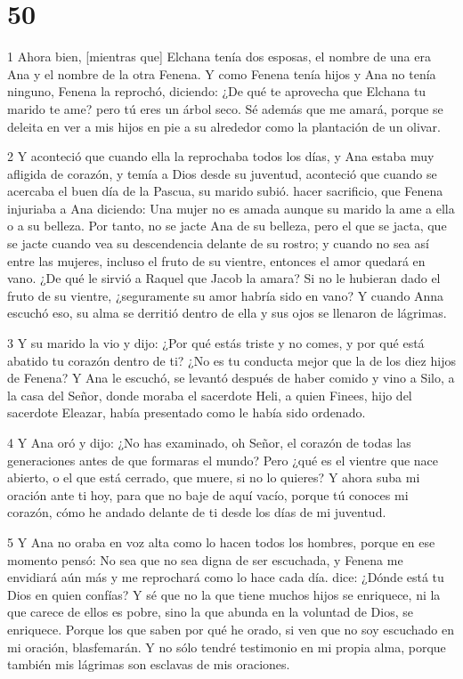 \chapter{50}

\par 1 Ahora bien, [mientras que] Elchana tenía dos esposas, el nombre de una era Ana y el nombre de la otra Fenena. Y como Fenena tenía hijos y Ana no tenía ninguno, Fenena la reprochó, diciendo: ¿De qué te aprovecha que Elchana tu marido te ame? pero tú eres un árbol seco. Sé además que me amará, porque se deleita en ver a mis hijos en pie a su alrededor como la plantación de un olivar.

\par 2 Y aconteció que cuando ella la reprochaba todos los días, y Ana estaba muy afligida de corazón, y temía a Dios desde su juventud, aconteció que cuando se acercaba el buen día de la Pascua, su marido subió. hacer sacrificio, que Fenena injuriaba a Ana diciendo: Una mujer no es amada aunque su marido la ame a ella o a su belleza. Por tanto, no se jacte Ana de su belleza, pero el que se jacta, que se jacte cuando vea su descendencia delante de su rostro; y cuando no sea así entre las mujeres, incluso el fruto de su vientre, entonces el amor quedará en vano. ¿De qué le sirvió a Raquel que Jacob la amara? Si no le hubieran dado el fruto de su vientre, ¿seguramente su amor habría sido en vano? Y cuando Anna escuchó eso, su alma se derritió dentro de ella y sus ojos se llenaron de lágrimas.

\par 3 Y su marido la vio y dijo: ¿Por qué estás triste y no comes, y por qué está abatido tu corazón dentro de ti? ¿No es tu conducta mejor que la de los diez hijos de Fenena? Y Ana le escuchó, se levantó después de haber comido y vino a Silo, a la casa del Señor, donde moraba el sacerdote Heli, a quien Finees, hijo del sacerdote Eleazar, había presentado como le había sido ordenado.

\par 4 Y Ana oró y dijo: ¿No has examinado, oh Señor, el corazón de todas las generaciones antes de que formaras el mundo? Pero ¿qué es el vientre que nace abierto, o el que está cerrado, que muere, si no lo quieres? Y ahora suba mi oración ante ti hoy, para que no baje de aquí vacío, porque tú conoces mi corazón, cómo he andado delante de ti desde los días de mi juventud.

\par 5 Y Ana no oraba en voz alta como lo hacen todos los hombres, porque en ese momento pensó: No sea que no sea digna de ser escuchada, y Fenena me envidiará aún más y me reprochará como lo hace cada día. dice: ¿Dónde está tu Dios en quien confías? Y sé que no la que tiene muchos hijos se enriquece, ni la que carece de ellos es pobre, sino la que abunda en la voluntad de Dios, se enriquece. Porque los que saben por qué he orado, si ven que no soy escuchado en mi oración, blasfemarán. Y no sólo tendré testimonio en mi propia alma, porque también mis lágrimas son esclavas de mis oraciones.

